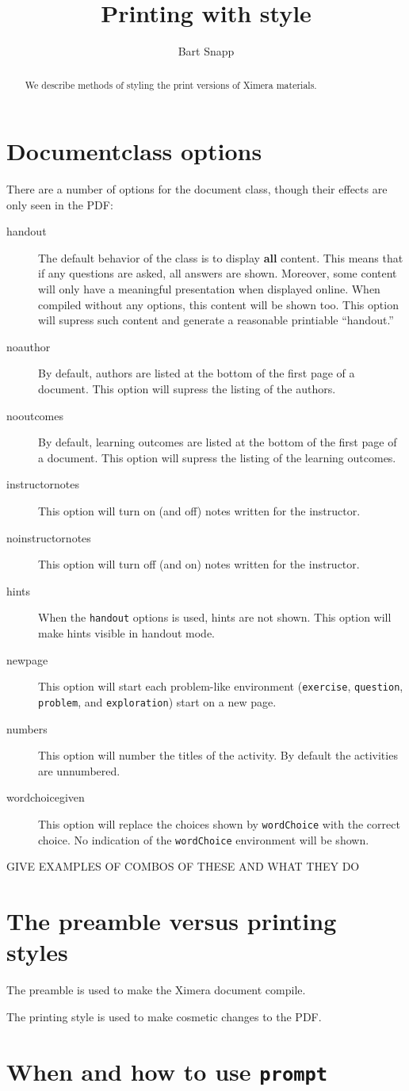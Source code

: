 \documentclass{ximera}
\title{Printing with style}
\author{Bart Snapp}
\begin{document}
\begin{abstract}
We describe methods of styling the print versions of Ximera materials.
\end{abstract}
\maketitle
 


\section{Documentclass options}

There are a number of options for the document class, though their
effects are only seen in the PDF:
 
\begin{description}
\item[handout] The default behavior of the class is to display \textbf{all} content. This means that if any questions are asked, all answers are shown. Moreover, some content will only have a meaningful presentation when displayed online. When compiled without any options, this content will be shown too. This option will supress such content and generate a reasonable printiable ``handout.''
\item[noauthor] By default, authors are listed at the bottom of the first page of a document. This option will supress the listing of the authors.
\item[nooutcomes] By default, learning outcomes are listed at the bottom of the first page of a document. This option will supress the listing of the learning outcomes.
\item[instructornotes] This option will turn on (and off) notes written for the instructor.
\item[noinstructornotes] This option will turn off (and on) notes written for the instructor.
\item[hints] When the \texttt{handout} options is used, hints are not shown. This option will make hints visible in handout mode.
\item[newpage] This option will start each problem-like environment (\texttt{exercise}, \texttt{question}, \texttt{problem}, and \texttt{exploration}) start on a new page.
\item[numbers] This option will number the titles of the activity. By default the activities are unnumbered.
\item[wordchoicegiven] This option will replace the choices shown by \texttt{wordChoice} with the correct choice. No indication of the \texttt{wordChoice} environment will be shown.
\end{description}


GIVE EXAMPLES OF COMBOS OF THESE AND WHAT THEY DO

\section{The preamble versus printing styles}

The preamble is used to make the Ximera document compile.

The printing style is used to make cosmetic changes to the PDF.



\section{When and how to use \texttt{prompt}}
\end{document}
